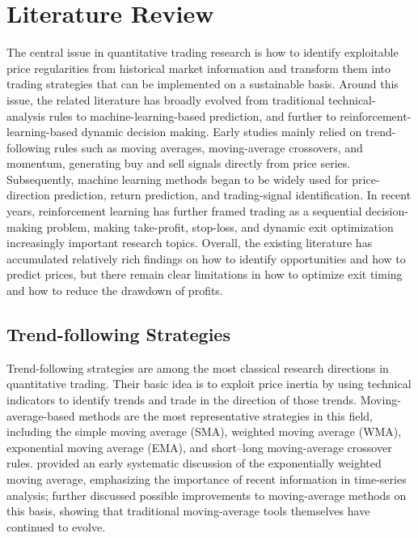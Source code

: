 \documentclass[12pt]{article}
\begin{document}

\section{Literature Review}\label{sec:literature}

The central issue in quantitative trading research is how to identify exploitable price 
regularities from historical market information and transform them into trading strategies that 
can be implemented on a sustainable basis. Around this issue, the related literature has 
broadly evolved from traditional technical-analysis rules to machine-learning-based prediction, 
and further to reinforcement-learning-based dynamic decision making. Early studies mainly 
relied on trend-following rules such as moving averages, moving-average crossovers, and 
momentum, generating buy and sell signals directly from price series. Subsequently, 
machine learning methods began to be widely used for price-direction prediction, return 
prediction, and trading-signal identification. In recent years, reinforcement learning has 
further framed trading as a sequential decision-making problem, making take-profit, stop-loss, 
and dynamic exit optimization increasingly important research topics. Overall, the existing 
literature has accumulated relatively rich findings on how to identify opportunities and how to 
predict prices, but there remain clear limitations in how to optimize exit timing and how to 
reduce the drawdown of profits.

\subsection{Trend-following Strategies}

Trend-following strategies are among the most classical research directions in quantitative 
trading. Their basic idea is to exploit price inertia by using technical indicators to identify 
trends and trade in the direction of those trends. Moving-average-based methods are the most 
representative strategies in this field, including the simple moving average (SMA), weighted 
moving average (WMA), exponential moving average (EMA), and short--long moving-average 
crossover rules. \citet{Hunter1986} provided an early systematic discussion of the exponentially 
weighted moving average, emphasizing the importance of recent information in time-series 
analysis; \citet{Hansun2013} further discussed possible improvements to moving-average methods 
on this basis, showing that traditional moving-average tools themselves have continued to 
evolve.
\end{document}

